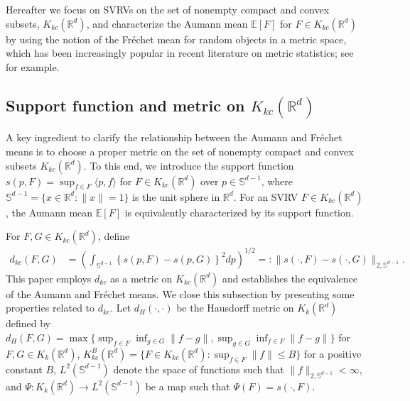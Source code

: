\documentclass[11pt,reqno]{amsart}
\begin{document}
Hereafter we focus on SVRVs on the set of nonempty compact and convex subsets, $K_{kc}(\mathbb{R}^d)$, and characterize the Aumann mean $\mathbb{E}[F]$ for $F\in K_{kc}(\mathbb{R}^d)$ by using the notion of the Fr\'echet mean for random objects in a metric space, which has been increasingly popular in recent literature on metric statistics; see \cite{DuChMu24} for example.

\subsection{Support function and metric on $K_{kc}(\mathbb{R}^d)$}\label{sub:supp}

A key ingredient to clarify the relationship between the Aumann and Fr\'echet means is to choose a proper metric on the set of nonempty compact and convex subsets $K_{kc}(\mathbb{R}^d)$. To this end, we introduce the support function $s(p,F)=\sup_{f \in F}\langle p,f \rangle$ for $F\in K_{kc}(\mathbb{R}^d)$ over $p\in \mathbb{S}^{d-1}$, where $\mathbb{S}^{d-1} = \{x \in \mathbb{R}^d: \|x\|=1\}$ is the unit sphere in $\mathbb{R}^d$. For an SVRV $F\in K_{kc}(\mathbb{R}^d)$, the Aumann mean $\mathbb{E}[F]$ is equivalently characterized by its support function.

For $F, G \in K_{kc}(\mathbb{R}^d)$, define 
\begin{align*}
d_{kc}(F, G) &= \left(\int_{\mathbb{S}^{d-1}} \left\{s(p, F) - s(p,G)\right\}^2 dp\right)^{1/2}=: \|s(\cdot, F) - s(\cdot, G)\|_{2,\mathbb{S}^{d-1}}. %
\end{align*}
This paper employs $d_{kc}$ as a metric on $K_{kc}(\mathbb{R}^d)$ and establishes the equivalence of the Aumann and Fr\'echet means. We close this subsection by presenting some properties related to $d_{kc}$. Let $d_H(\cdot, \cdot)$ be the Hausdorff metric on $K_k(\mathbb{R}^d)$ defined by $d_H(F,G)=\max\{\sup_{f\in F}\inf_{g \in G}\|f-g\|,\sup_{g\in G}\inf_{f \in F}\|f-g\|\}$ for $F,G \in K_k(\mathbb{R}^d)$, $K_{kc}^B(\mathbb{R}^d) = \{F \in K_{kc}(\mathbb{R}^d): \sup_{f \in F}\|f\|\leq B\}$ for a positive constant $B$, $L^2(\mathbb{S}^{d-1})$ denote the space of functions such that $\|f\|_{2,\mathbb{S}^{d-1}}<\infty$, and $\Psi:K_k(\mathbb{R}^d) \to L^2(\mathbb{S}^{d-1})$ be a map such that $\Psi(F) = s(\cdot, F)$. 
\end{document}
